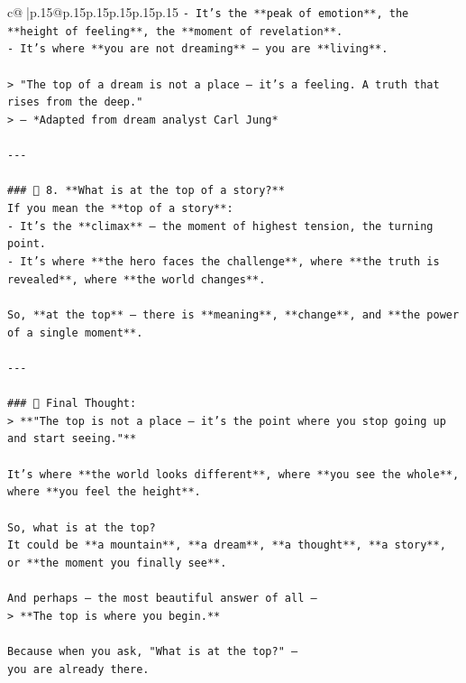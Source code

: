 \documentclass{article}
\begin{document}
{\begin{supertabular}{c@{$\;$}|p{.15\linewidth}@{}p{.15\linewidth}p{.15\linewidth}p{.15\linewidth}p{.15\linewidth}p{.15\linewidth}}
{{{\texttt{{-} It’s the **peak of emotion**, the **height of feeling**, the **moment of revelation**.} \\
\texttt{{-} It’s where **you are not dreaming** — you are **living**.} \\
\\ 
\texttt{> "The top of a dream is not a place — it’s a feeling. A truth that rises from the deep."  } \\
\texttt{> — *Adapted from dream analyst Carl Jung*} \\
\\ 
\texttt{{-}{-}{-}} \\
\\ 
\texttt{\#\#\# 🌌 8. **What is at the top of a story?**} \\
\texttt{If you mean the **top of a story**:} \\
\texttt{{-} It’s the **climax** — the moment of highest tension, the turning point.} \\
\texttt{{-} It’s where **the hero faces the challenge**, where **the truth is revealed**, where **the world changes**.} \\
\\ 
\texttt{So, **at the top** — there is **meaning**, **change**, and **the power of a single moment**.} \\
\\ 
\texttt{{-}{-}{-}} \\
\\ 
\texttt{\#\#\# 🌟 Final Thought:} \\
\texttt{> **"The top is not a place — it’s the point where you stop going up and start seeing."**} \\
\\ 
\texttt{It’s where **the world looks different**, where **you see the whole**, where **you feel the height**.} \\
\\ 
\texttt{So, what is at the top?  } \\
\texttt{It could be **a mountain**, **a dream**, **a thought**, **a story**, or **the moment you finally see**.} \\
\\ 
\texttt{And perhaps — the most beautiful answer of all —  } \\
\texttt{> **The top is where you begin.**} \\
\\ 
\texttt{Because when you ask, "What is at the top?" —  } \\
\texttt{you are already there.  } \\
}}}
\end{supertabular}}
\end{document}
